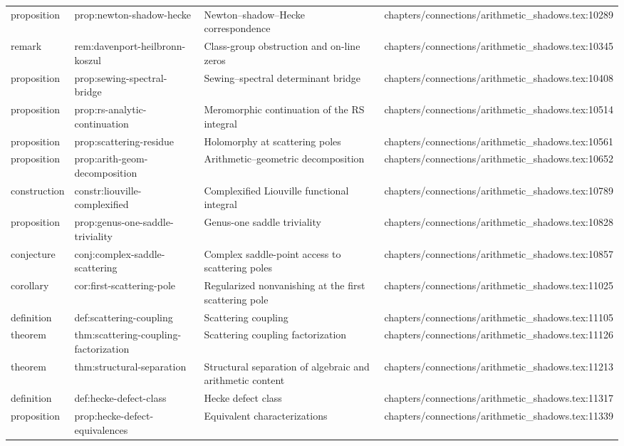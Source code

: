 \documentclass[11pt]{article}
\begin{document}
\begin{longtable}{L{0.10\textwidth}L{0.26\textwidth}L{0.42\textwidth}L{0.22\textwidth}}
proposition & prop:newton-shadow-hecke & Newton--shadow--Hecke correspondence & chapters/connections/arithmetic\_shadows.tex:10289\\
remark & rem:davenport-heilbronn-koszul & Class-group obstruction and on-line zeros & chapters/connections/arithmetic\_shadows.tex:10345\\
proposition & prop:sewing-spectral-bridge & Sewing--spectral determinant bridge & chapters/connections/arithmetic\_shadows.tex:10408\\
proposition & prop:rs-analytic-continuation & Meromorphic continuation of the RS integral & chapters/connections/arithmetic\_shadows.tex:10514\\
proposition & prop:scattering-residue & Holomorphy at scattering poles & chapters/connections/arithmetic\_shadows.tex:10561\\
proposition & prop:arith-geom-decomposition & Arithmetic--geometric decomposition & chapters/connections/arithmetic\_shadows.tex:10652\\
construction & constr:liouville-complexified & Complexified Liouville functional integral & chapters/connections/arithmetic\_shadows.tex:10789\\
proposition & prop:genus-one-saddle-triviality & Genus-one saddle triviality & chapters/connections/arithmetic\_shadows.tex:10828\\
conjecture & conj:complex-saddle-scattering & Complex saddle-point access to scattering poles & chapters/connections/arithmetic\_shadows.tex:10857\\
corollary & cor:first-scattering-pole & Regularized nonvanishing at the first scattering pole & chapters/connections/arithmetic\_shadows.tex:11025\\
definition & def:scattering-coupling & Scattering coupling & chapters/connections/arithmetic\_shadows.tex:11105\\
theorem & thm:scattering-coupling-factorization & Scattering coupling factorization & chapters/connections/arithmetic\_shadows.tex:11126\\
theorem & thm:structural-separation & Structural separation of algebraic and arithmetic content & chapters/connections/arithmetic\_shadows.tex:11213\\
definition & def:hecke-defect-class & Hecke defect class & chapters/connections/arithmetic\_shadows.tex:11317\\
proposition & prop:hecke-defect-equivalences & Equivalent characterizations & chapters/connections/arithmetic\_shadows.tex:11339\\

\end{longtable}
\end{document}
